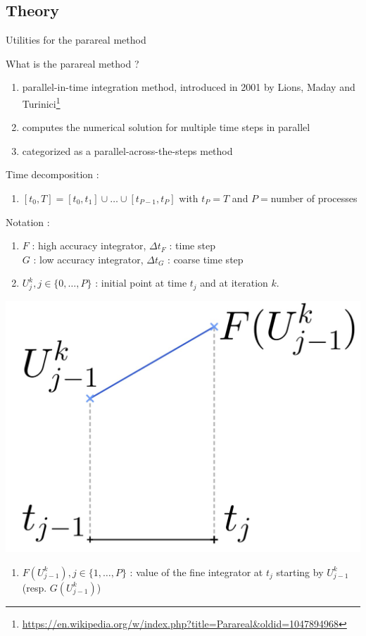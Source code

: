 \subsection{Theory}

\begin{frame}{Utilities for the parareal method}
	
	\small
	What is the parareal method ?
	\begin{enumerate}[\textbullet]
		\item parallel-in-time integration method, introduced in 2001 by Lions, Maday and Turinici\footnote[frame]{\url{https://en.wikipedia.org/w/index.php?title=Parareal&oldid=1047894968}}
		\item computes the numerical solution for multiple time steps in parallel
		\item categorized as a parallel-across-the-steps method 
	\end{enumerate}

	Time decomposition :
	\begin{enumerate}[\textbullet]
		\item $[t_0,T]=[t_0,t_1]\cup\dots\cup[t_{P-1},t_P]$ with $t_P=T$ and $P=$number of processes
	\end{enumerate}

	\begin{minipage}{.68\linewidth}
		Notation :
		\begin{enumerate}[\textbullet]
			\item $F$ : high accuracy integrator, \quad $\Delta t_F$ : time step \\
			$G$ : low accuracy integrator, \quad $\Delta t_G$ : coarse time step
			\item $U_j^k, j\in\{0,\dots,P\}$ : initial point at time $t_j$ and at iteration $k$.
		\end{enumerate}
	\end{minipage}
	\begin{minipage}{.28\linewidth}
		\qquad \includegraphics[width=0.7\linewidth]{images/parareal/explane_F.jpg}
	\end{minipage}
	\begin{enumerate}[\textbullet]
		\item $F(U_{j-1}^k), j\in\{1,\dots,P\}$ : value of the fine integrator at $t_j$ starting by $U_{j-1}^k$ (resp. $G(U_{j-1}^k)$)
	\end{enumerate}
	
\end{frame}

